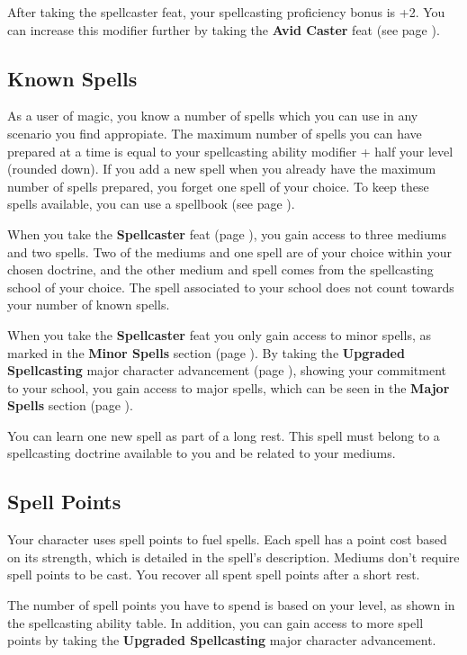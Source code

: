     After taking the spellcaster feat, your spellcasting proficiency bonus is +2.
    You can increase this modifier further by taking the \textbf{Avid Caster} feat (see page \pageref{feat::avidcaster}).

\subsection*{Known Spells}
    As a user of magic, you know a number of spells which you can use in any scenario you find appropiate.
    The maximum number of spells you can have prepared at a time is equal to your spellcasting ability modifier + half your level (rounded down).
    If you add a new spell when you already have the maximum number of spells prepared, you forget one spell of your choice.
    To keep these spells available, you can use a spellbook (see page \pageref{item::spellbook}).

    When you take the \textbf{Spellcaster} feat (page \pageref{feat::spellcaster}), you gain access to three mediums and two spells.
    Two of the mediums and one spell are of your choice within your chosen doctrine, and the other medium and spell comes from the spellcasting school of your choice.
    The spell associated to your school does not count towards your number of known spells.

    When you take the \textbf{Spellcaster} feat you only gain access to minor spells, as marked in the \textbf{Minor Spells} section (page \pageref{sec::minorspells}).
    By taking the \textbf{Upgraded Spellcasting} major character advancement (page \pageref{mca::upgradedspellcasting}), showing your commitment to your school, you gain access to major spells, which can be seen in the \textbf{Major Spells} section (page \pageref{sec::majorspells}).

    You can learn one new spell as part of a long rest.
    This spell must belong to a spellcasting doctrine available to you and be related to your mediums.

\subsection*{Spell Points}
    Your character uses spell points to fuel spells.
    Each spell has a point cost based on its strength, which is detailed in the spell's description.
    Mediums don't require spell points to be cast.
    You recover all spent spell points after a short rest.

    The number of spell points you have to spend is based on your level, as shown in the spellcasting ability table.
    In addition, you can gain access to more spell points by taking the \textbf{Upgraded Spellcasting} major character advancement.

